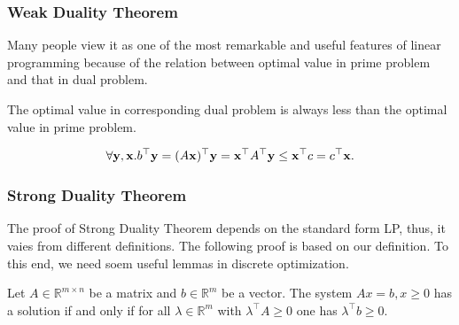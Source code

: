 \documentclass[12pt]{article}
\begin{document}
\subsubsection{Weak Duality Theorem}

Many people view it as one of the most
remarkable and useful features of linear
programming because of the relation between
optimal value in prime problem and that in
dual problem.

\begin{Theorem}
    The optimal value in corresponding dual
    problem is
    always less than the optimal value in
    prime problem.
\end{Theorem}

\begin{Proof}
  \begin{align*}
      \forall \mathbf{y},\mathbf{x}. b^\top \mathbf{y} =
      (A\mathbf{x})^\top \mathbf{y}
      =\mathbf{x}^\top A^\top \mathbf{y} \leq \mathbf{x}^\top c =
      c^\top \mathbf{x}.
  \end{align*}
\end{Proof}

\subsubsection{Strong Duality Theorem}

The proof of Strong Duality Theorem depends on the standard form LP, thus, it vaies from different definitions. The following proof is based on our definition. To this end, we need soem useful lemmas in discrete optimization.

\begin{Lemma}
  \label{FarkasLemma}
  Let $A \in \mathbb{R}^{m \times n}$ be a matrix and $b \in \mathbb{R}^m$ be a vector. The system $Ax = b, x \geq 0$ has a solution if and only if for all $\lambda \in \mathbb{R}^m$ with $\lambda^\top A \geq 0$ one has $\lambda^\top b \geq 0$.

  \normalfont  {}
\end{Lemma}

\begin{Proof}
\end{Proof}
\end{document}

